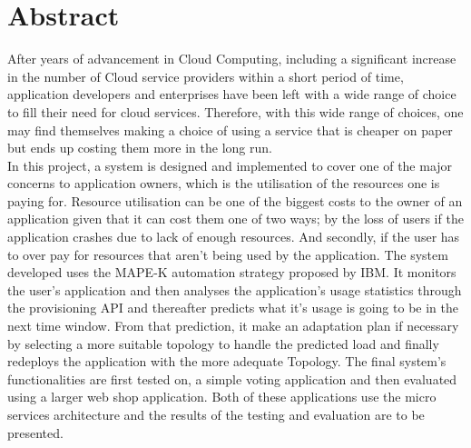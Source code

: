 \begingroup
\let\clearpage\relax
\let\cleardoublepage\relax
\let\cleardoublepage\relax

\chapter*{Abstract}
After years of advancement in Cloud Computing, including a significant increase in the number of Cloud service providers within a short period of time, application developers and enterprises have been left with a wide range of choice to fill their need for cloud services. Therefore, with this wide range of choices, one may find themselves making a choice of using a service that is cheaper on paper but ends up costing them more in the long run. 
\\In this project, a system is designed and implemented to cover one of the major concerns to application owners, which is the utilisation of the resources one is paying for. Resource utilisation can be one of the biggest costs to the owner of an application given that it can cost them one of two ways; by the loss of users if the application crashes due to lack of enough resources. And secondly, if the user has to over pay for resources that aren't being used by the application. The system developed uses the MAPE-K automation strategy proposed by IBM. It monitors the user's application and then analyses the application's usage statistics through the provisioning API and thereafter predicts what it's usage is going to be in the next time window. From that prediction, it make an adaptation plan if necessary by selecting a more suitable topology to handle the predicted load and finally redeploys the application with the more adequate Topology. The final system's functionalities are first tested on, a simple voting application and then evaluated using a larger web shop application. Both of these applications use the micro services architecture and the results of the testing and evaluation are to be presented.

\vfill

\endgroup

\vfill
